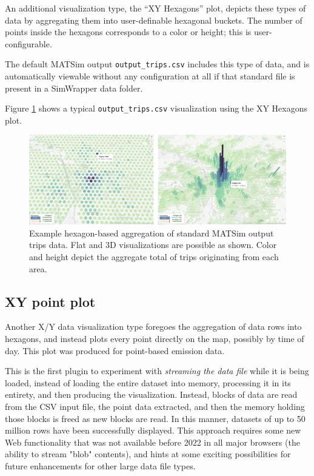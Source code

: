 An additional visualization type, the ``XY Hexagons'' plot, depicts these types of data by aggregating them into user-definable hexagonal buckets. The number of points inside the hexagons corresponds to a color or height; this is user-configurable.

The default MATSim output \texttt{output\_trips.csv} includes this type of data, and is automatically viewable without any configuration at all if that standard file is present in a SimWrapper data folder.

Figure \ref{fig:simwrapper-xy-hexagons} shows a typical \texttt{output\_trips.csv} visualization using the XY Hexagons plot.

\begin{figure}[ht]
  \centering
  \includegraphics[width=0.95\linewidth]{chapters/31-simwrapper/images/xy-hexagons.jpg}
  \caption{Example hexagon-based aggregation of standard MATSim output trips data. Flat and 3D visualizations are possible as shown. Color and height depict the aggregate total of trips originating from each area. }
  \label{fig:simwrapper-xy-hexagons}
\end{figure}

\hypertarget{simwrapper-xyt-plots}{%
\subsection{XY point plot}\label{simwrapper-xy-point-plots}}

Another X/Y data visualization type foregoes the aggregation of data rows into hexagons, and instead plots every point directly on the map, possibly by time of day. This plot was produced for point-based emission data.

This is the first plugin to experiment with \emph{streaming the data file} while it is being loaded, instead of loading the entire dataset into memory, processing it in its entirety, and then producing the visualization. Instead, blocks of data are read from the CSV input file, the point data extracted, and then the memory holding those blocks is freed as new blocks are read. In this manner, datasets of up to 50 million rows have been successfully displayed. This approach requires some new Web functionality that was not available before 2022 in all major browsers (the ability to stream "blob" contents), and hints at some exciting possibilities for future enhancements for other large data file types.


